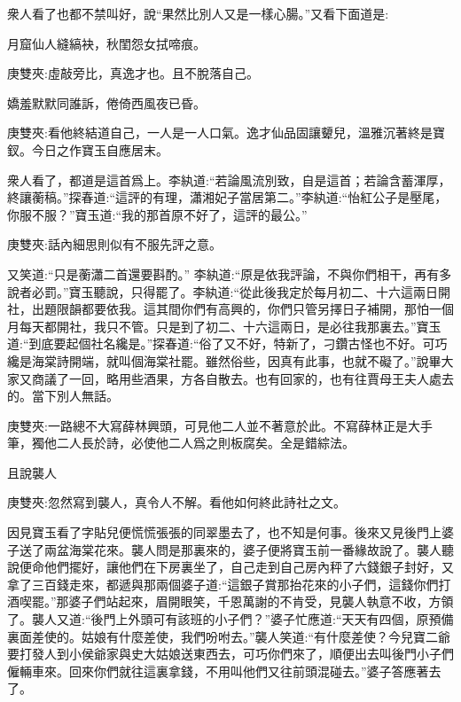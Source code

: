 \begin{parag}
    衆人看了也都不禁叫好，說“果然比別人又是一樣心腸。”又看下面道是:
\end{parag}


\begin{poem}
    \begin{pl}月窟仙人縫縞袂，秋閨怨女拭啼痕。\end{pl}\begin{note}庚雙夾:虛敲旁比，真逸才也。且不脫落自己。\end{note}

    \begin{pl}嬌羞默默同誰訴，倦倚西風夜已昏。\end{pl}\begin{note}庚雙夾:看他終結道自己，一人是一人口氣。逸才仙品固讓顰兒，溫雅沉著終是寶釵。今日之作寶玉自應居末。\end{note}
\end{poem}


\begin{parag}
    衆人看了，都道是這首爲上。李紈道:“若論風流別致，自是這首；若論含蓄渾厚，終讓蘅稿。”探春道:“這評的有理，瀟湘妃子當居第二。”李紈道:“怡紅公子是壓尾，你服不服？”寶玉道:“我的那首原不好了，這評的最公。”\begin{note}庚雙夾:話內細思則似有不服先評之意。\end{note}又笑道:“只是蘅瀟二首還要斟酌。” 李紈道:“原是依我評論，不與你們相干，再有多說者必罰。”寶玉聽說，只得罷了。李紈道:“從此後我定於每月初二、十六這兩日開社，出題限韻都要依我。這其間你們有高興的，你們只管另擇日子補開，那怕一個月每天都開社，我只不管。只是到了初二、十六這兩日，是必往我那裏去。”寶玉道:“到底要起個社名纔是。”探春道:“俗了又不好，特新了，刁鑽古怪也不好。可巧纔是海棠詩開端，就叫個海棠社罷。雖然俗些，因真有此事，也就不礙了。”說畢大家又商議了一回，略用些酒果，方各自散去。也有回家的，也有往賈母王夫人處去的。當下別人無話。\begin{note}庚雙夾:一路總不大寫薛林興頭，可見他二人並不著意於此。不寫薛林正是大手筆，獨他二人長於詩，必使他二人爲之則板腐矣。全是錯綜法。\end{note}
\end{parag}


\begin{parag}
    且說襲人\begin{note}庚雙夾:忽然寫到襲人，真令人不解。看他如何終此詩社之文。\end{note}因見寶玉看了字貼兒便慌慌張張的同翠墨去了，也不知是何事。後來又見後門上婆子送了兩盆海棠花來。襲人問是那裏來的，婆子便將寶玉前一番緣故說了。襲人聽說便命他們擺好，讓他們在下房裏坐了，自己走到自己房內秤了六錢銀子封好，又拿了三百錢走來，都遞與那兩個婆子道:“這銀子賞那抬花來的小子們，這錢你們打酒喫罷。”那婆子們站起來，眉開眼笑，千恩萬謝的不肯受，見襲人執意不收，方領了。襲人又道:“後門上外頭可有該班的小子們？”婆子忙應道:“天天有四個，原預備裏面差使的。姑娘有什麼差使，我們吩咐去。”襲人笑道:“有什麼差使？今兒寶二爺要打發人到小侯爺家與史大姑娘送東西去，可巧你們來了，順便出去叫後門小子們僱輛車來。回來你們就往這裏拿錢，不用叫他們又往前頭混碰去。”婆子答應著去了。
\end{parag}


